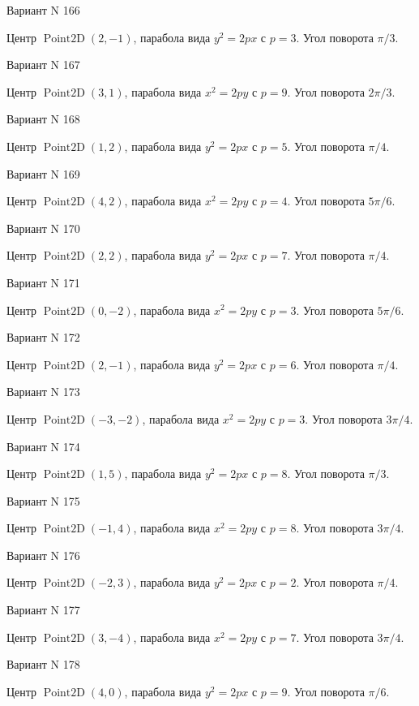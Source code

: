 \documentclass[11pt]{report}
\begin{document}
Вариант N 166

Центр $\operatorname{Point2D}\left(2, -1\right)$, парабола вида $y^{2} = 2px$ с $p = 3$. Угол поворота $\pi / 3$.

Вариант N 167

Центр $\operatorname{Point2D}\left(3, 1\right)$, парабола вида $x^{2} = 2py$ с $p = 9$. Угол поворота $2 \pi / 3$.

Вариант N 168

Центр $\operatorname{Point2D}\left(1, 2\right)$, парабола вида $y^{2} = 2px$ с $p = 5$. Угол поворота $\pi / 4$.

Вариант N 169

Центр $\operatorname{Point2D}\left(4, 2\right)$, парабола вида $x^{2} = 2py$ с $p = 4$. Угол поворота $5 \pi / 6$.

Вариант N 170

Центр $\operatorname{Point2D}\left(2, 2\right)$, парабола вида $y^{2} = 2px$ с $p = 7$. Угол поворота $\pi / 4$.

Вариант N 171

Центр $\operatorname{Point2D}\left(0, -2\right)$, парабола вида $x^{2} = 2py$ с $p = 3$. Угол поворота $5 \pi / 6$.

Вариант N 172

Центр $\operatorname{Point2D}\left(2, -1\right)$, парабола вида $y^{2} = 2px$ с $p = 6$. Угол поворота $\pi / 4$.

Вариант N 173

Центр $\operatorname{Point2D}\left(-3, -2\right)$, парабола вида $x^{2} = 2py$ с $p = 3$. Угол поворота $3 \pi / 4$.

Вариант N 174

Центр $\operatorname{Point2D}\left(1, 5\right)$, парабола вида $y^{2} = 2px$ с $p = 8$. Угол поворота $\pi / 3$.

Вариант N 175

Центр $\operatorname{Point2D}\left(-1, 4\right)$, парабола вида $x^{2} = 2py$ с $p = 8$. Угол поворота $3 \pi / 4$.

Вариант N 176

Центр $\operatorname{Point2D}\left(-2, 3\right)$, парабола вида $y^{2} = 2px$ с $p = 2$. Угол поворота $\pi / 4$.

Вариант N 177

Центр $\operatorname{Point2D}\left(3, -4\right)$, парабола вида $x^{2} = 2py$ с $p = 7$. Угол поворота $3 \pi / 4$.

Вариант N 178

Центр $\operatorname{Point2D}\left(4, 0\right)$, парабола вида $y^{2} = 2px$ с $p = 9$. Угол поворота $\pi / 6$.
\end{document}
